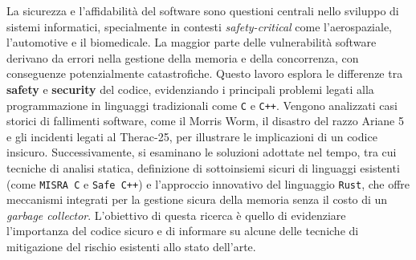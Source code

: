 La sicurezza e l'affidabilità del software sono questioni centrali nello sviluppo di sistemi informatici, specialmente in contesti \textit{safety-critical} come l'aerospaziale, l'automotive e il biomedicale.
La maggior parte delle vulnerabilità software derivano da errori nella gestione della memoria e della concorrenza, con conseguenze potenzialmente catastrofiche. Questo lavoro esplora le differenze tra \textbf{safety} e \textbf{security} del codice, evidenziando i principali problemi legati alla programmazione in linguaggi tradizionali come \texttt{C} e \texttt{C++}. Vengono analizzati casi storici di fallimenti software, come il Morris Worm, il disastro del razzo Ariane 5 e gli incidenti legati al Therac-25, per illustrare le implicazioni di un codice insicuro. Successivamente, si esaminano le soluzioni adottate nel tempo, tra cui tecniche di analisi statica, definizione di sottoinsiemi sicuri di linguaggi esistenti (come \texttt{MISRA C} e \texttt{Safe C++}) e l'approccio innovativo del linguaggio \texttt{Rust}, che offre meccanismi integrati per la gestione sicura della memoria senza il costo di un \textit{garbage collector}. L'obiettivo di questa ricerca è quello di evidenziare l'importanza del codice sicuro e di informare su alcune delle tecniche di mitigazione del rischio esistenti allo stato dell'arte.
